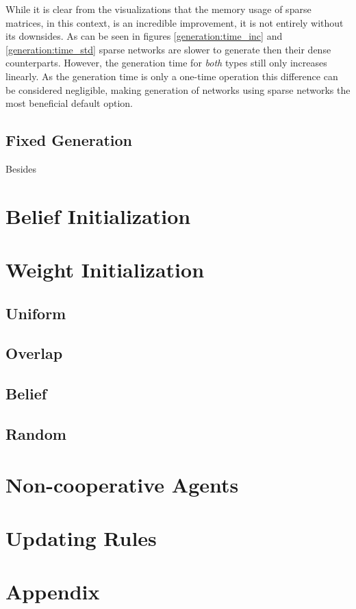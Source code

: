 \documentclass{article}
\begin{document}
\newpage

While it is clear from the visualizations that the memory usage of sparse matrices, in this context, is an incredible improvement, it is not entirely without its downsides. As can be seen in figures \ref{generation:time_inc} and \ref{generation:time_std} sparse networks are slower to generate then their dense counterparts. However, the generation time for \emph{both} types still only increases linearly. As the generation time is only a one-time operation this difference can be considered negligible, making generation of networks using sparse networks the most beneficial default option.

\subsection{Fixed Generation}

Besides 

\section{Belief Initialization}

\section{Weight Initialization}
\subsection{Uniform}
\subsection{Overlap}
\subsection{Belief}
\subsection{Random}

\section{Non-cooperative Agents}

\section{Updating Rules}
\newpage
\section{Appendix}
\end{document}
